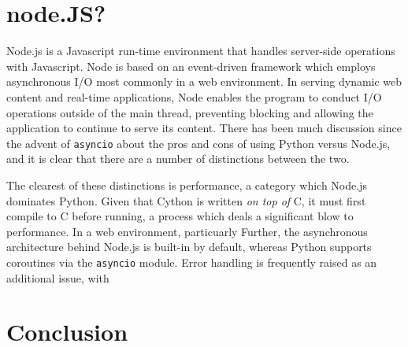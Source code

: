 \documentclass[letterpaper,twocolumn,10pt]{article}
\begin{document}
\section{node.JS?}

Node.js is a Javascript run-time environment that handles server-side operations with Javascript. Node is based on an event-driven framework which employs asynchronous I/O most commonly in a web environment. In serving dynamic web content and real-time applications, Node enables the program to conduct I/O operations outside of the main thread, preventing blocking and allowing the application to continue to serve its content. There has been much discussion since the advent of \texttt{asyncio} about the pros and cons of using Python versus Node.js, and it is clear that there are a number of distinctions between the two. 

The clearest of these distinctions is performance, a category which Node.js dominates Python. Given that Cython is written \textit{on top of} C, it must first compile to C before running, a process which deals a significant blow to performance. In a web environment, particuarly  Further, the asynchronous architecture behind Node.js is built-in by default, whereas Python supports coroutines via the \texttt{asyncio} module. Error handling is frequently raised as an additional issue, with 
\section{Conclusion}
\end{document}
